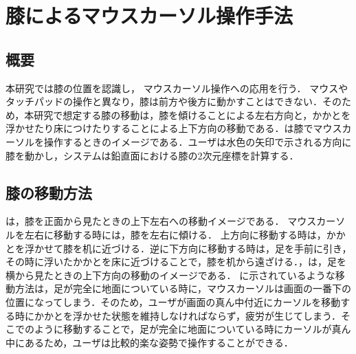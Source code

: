 \chapter{膝によるマウスカーソル操作手法}
\section{概要}
本研究では膝の位置を認識し，
マウスカーソル操作への応用を行う．
マウスやタッチパッドの操作と異なり，膝は前方や後方に動かすことはできない．そのため，本研究で想定する膝の移動は，膝を傾けることによる左右方向と，かかとを浮かせたり床につけたりすることによる上下方向の移動である．は膝でマウスカーソルを操作するときのイメージである．ユーザは水色の矢印で示される方向に膝を動かし，システムは鉛直面における膝の2次元座標を計算する．

\section{膝の移動方法}
は，膝を正面から見たときの上下左右への移動イメージである．
マウスカーソルを左右に移動する時には，膝を左右に傾ける．
上方向に移動する時は，かかとを浮かせて膝を机に近づける．逆に下方向に移動する時は，足を手前に引き，その時に浮いたかかとを床に近づけることで，膝を机から遠ざける．，は，足を横から見たときの上下方向の移動のイメージである．
に示されているような移動方法は，足が完全に地面についている時に，マウスカーソルは画面の一番下の位置になってしまう．そのため，ユーザが画面の真ん中付近にカーソルを移動する時にかかとを浮かせた状態を維持しなければならず，疲労が生じてしまう．そこでのように移動することで，足が完全に地面についている時にカーソルが真ん中にあるため，ユーザは比較的楽な姿勢で操作することができる．

